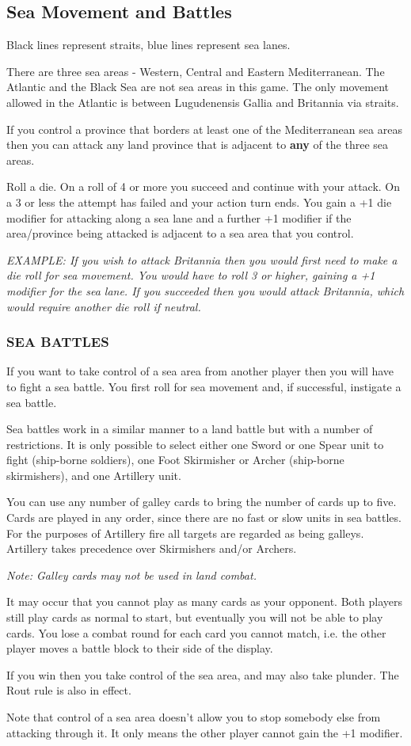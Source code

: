 \subsection{Sea Movement and Battles}

Black lines represent straits, blue lines represent sea lanes.

There are three sea areas - Western, Central and Eastern Mediterranean. The Atlantic and the Black Sea are not sea areas in this game. The only movement allowed in the Atlantic is between Lugudenensis Gallia and Britannia via straits.

If you control a province that borders at least one of the Mediterranean sea areas then you can attack any land province that is adjacent to \textbf{any} of the three sea areas.

Roll a die. On a roll of 4 or more you succeed and continue with your attack. On a 3 or less the attempt has failed and your action turn ends. You gain a +1 die modifier for attacking along a sea lane and a further +1 modifier if the area/province being attacked is adjacent to a sea area that you control.

\textit{EXAMPLE: If you wish to attack Britannia then you would first need to make a die roll for sea movement. You would have to roll 3 or higher, gaining a +1 modifier for the sea lane. If you succeeded then you would attack Britannia, which would require another die roll if neutral.}

\subsubsection{SEA BATTLES}

If you want to take control of a sea area from another player then you will have to fight a sea battle. You first roll for sea movement and, if successful, instigate a sea battle.

Sea battles work in a similar manner to a land battle but with a number of restrictions. It is only possible to select either one Sword or one Spear unit to fight (ship-borne soldiers), one Foot Skirmisher or Archer (ship-borne skirmishers), and one Artillery unit.

You can use any number of galley cards to bring the number of cards up to five. Cards are played in any order, since there are no fast or slow units in sea battles. For the purposes of Artillery fire all targets are regarded as being galleys. Artillery takes precedence over Skirmishers and/or Archers.

\textit{Note: Galley cards may not be used in land combat.}

It may occur that you cannot play as many cards as your opponent. Both players still play cards as normal to start, but eventually you will not be able to play cards. You lose a combat round for each card you cannot match, i.e. the other player moves a battle block to their side of the display.

If you win then you take control of the sea area, and may also take plunder. The Rout rule is also in effect.

Note that control of a sea area doesn't allow you to stop somebody else from attacking through it. It only means the other player cannot gain the +1 modifier.